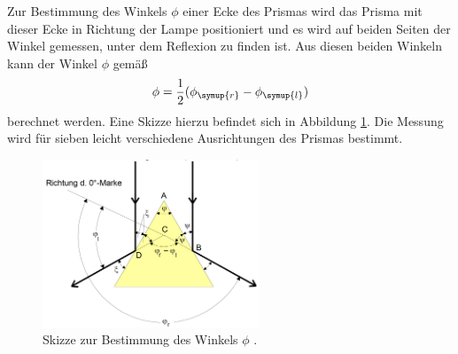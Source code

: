 Zur Bestimmung des Winkels $\phi$ einer Ecke des Prismas wird das Prisma mit dieser
Ecke in Richtung der Lampe positioniert und es wird auf beiden Seiten der Winkel gemessen,
unter dem Reflexion zu finden ist. Aus diesen beiden Winkeln kann der Winkel $\phi$
gemäß
\begin{equation}
  \phi=\frac{1}{2}(\phi_{\symup{r}}-\phi_{\symup{l}})
  \label{eqn:phi}
\end{equation}
berechnet werden. Eine Skizze hierzu befindet sich in Abbildung \ref{fig:phi}.
Die Messung wird für sieben leicht verschiedene Ausrichtungen des Prismas bestimmt.

\begin{figure}[H]
  \centering
  \includegraphics[height=5cm]{data/phi.png}
  \caption{Skizze zur Bestimmung des Winkels $\phi$ \cite{Versuchsanleitung}.}
  \label{fig:phi}
\end{figure}
